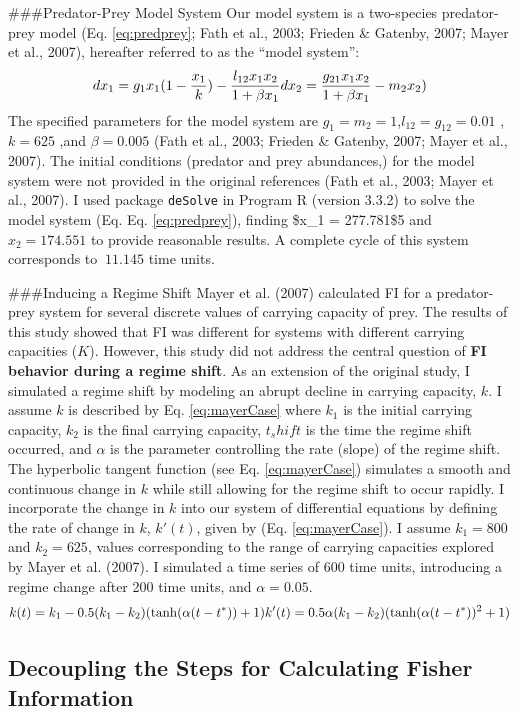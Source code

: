 \documentclass[12pt,twoside,openany]{reedthesis}
\begin{document}
\#\#\#Predator-Prey Model System
Our model system is a two-species predator-prey model (Eq. \eqref{eq:predprey}; Fath et al., 2003; Frieden \& Gatenby, 2007; Mayer et al., 2007), hereafter referred to as the ``model system'':
\begin{equation} 
  dx_1 = g_{1}x_{1}(1-\frac{x_1}{k})- \frac{l_{12} x_{1} x_{2}}{1+\beta x_{1}} \\
  dx_2 = \frac{g_{21}x_1 x_2}{1+\beta x_1} - m_2 x_2)
  \label{eq:predprey}
\end{equation}
The specified parameters for the model system are \(g_1=m_2=1\),\(l_{12}=g_{12}= 0.01\) ,\(k=625\) ,and \(\beta=0.005\) (Fath et al., 2003; Frieden \& Gatenby, 2007; Mayer et al., 2007). The initial conditions (predator and prey abundances,) for the model system were not provided in the original references (Fath et al., 2003; Mayer et al., 2007). I used package \texttt{deSolve} in Program R (version 3.3.2) to solve the model system (Eq. Eq. \eqref{eq:predprey}), finding \$x\_1 = 277.781\$5 and \(x_2= 174.551\) to provide reasonable results. A complete cycle of this system corresponds to \(~11.145\) time units.

\#\#\#Inducing a Regime Shift
Mayer et al. (2007) calculated FI for a predator-prey system for several discrete values of carrying capacity of prey. The results of this study showed that FI was different for systems with different carrying capacities (\(K\)). However, this study did not address the central question of \textbf{FI behavior during a regime shift}. As an extension of the original study, I simulated a regime shift by modeling an abrupt decline in carrying capacity, \(k\). I assume \(k\) is described by Eq. \eqref{eq:mayerCase} where \(k_1\) is the initial carrying capacity, \(k_2\) is the final carrying capacity, \(t_shift\) is the time the regime shift occurred, and \(\alpha\) is the parameter controlling the rate (slope) of the regime shift. The hyperbolic tangent function (see Eq. \eqref{eq:mayerCase}) simulates a smooth and continuous change in \(k\) while still allowing for the regime shift to occur rapidly. I incorporate the change in \(k\) into our system of differential equations by defining the rate of change in \(k\), \(k'(t)\), given by (Eq. \eqref{eq:mayerCase}). I assume \(k_1=800\) and \(k_2=625\), values corresponding to the range of carrying capacities explored by Mayer et al. (2007). I simulated a time series of 600 time units, introducing a regime change after 200 time units, and \(\alpha=0.05\).
\begin{equation}  
  k(t) = k_1  - 0.5(k_1-k_2)(\tanh(\alpha (t-t^*))+1)     \\
  k'(t) = 0.5\alpha (k_1-k_2)(\tanh(\alpha(t-t^*))^2 +1)      \\ 
\label{eq:mayerCase}
\end{equation}
\hypertarget{decoupling-the-steps-for-calculating-fisher-information}{%
\subsection{Decoupling the Steps for Calculating Fisher Information}\label{decoupling-the-steps-for-calculating-fisher-information}}
\end{document}
